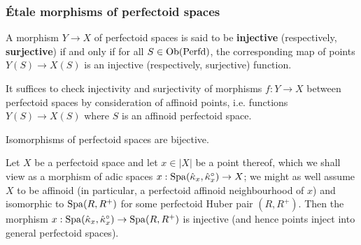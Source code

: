         \subsubsection{\'Etale morphisms of perfectoid spaces}
            \begin{definition} \label{def: injections_and_surjections_between_perfectoid_spaces}
                A morphism $Y \to X$ of perfectoid spaces is said to be \textbf{injective} (respectively, \textbf{surjective}) if and only if for all $S \in \mathrm{Ob}(\mathrm{Perfd})$, the corresponding map of points $Y(S) \to X(S)$ is an injective (respectively, surjective) function.
            \end{definition}
            \begin{remark}
                It suffices to check injectivity and surjectivity of morphisms $f: Y \to X$ between perfectoid spaces by consideration of affinoid points, i.e. functions $Y(S) \to X(S)$ where $S$ is an affinoid perfectoid space. 
            \end{remark}
            \begin{remark}
                Isomorphisms of perfectoid spaces are bijective.
            \end{remark}
            \begin{example}[Points]
                Let $X$ be a perfectoid space and let $x \in |X|$ be a point thereof, which we shall view as a morphism of adic spaces $x: \operatorname{Spa}(\hat{\kappa}_x, \hat{\kappa}_x^{\circ}) \to X$; we might as well assume $X$ to be affinoid (in particular, a perfectoid affinoid neighbourhood of $x$) and isomorphic to $\operatorname{Spa}(R, R^+)$ for some perfectoid Huber pair $(R, R^+)$. Then the morphism $x: \operatorname{Spa}(\hat{\kappa}_x, \hat{\kappa}_x^{\circ}) \to \operatorname{Spa}(R, R^+)$ is injective (and hence points inject into general perfectoid spaces).
            \end{example}
